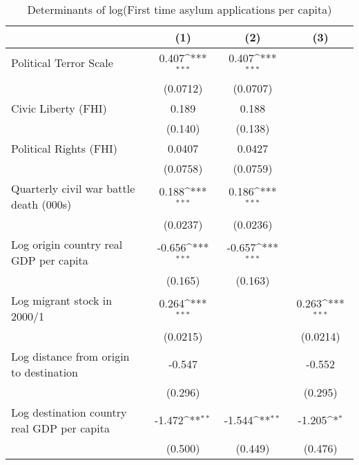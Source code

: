 \begin{table}[htbp]\centering
\def\sym#1{\ifmmode^{#1}\else\(^{#1}\)\fi}
\caption{Determinants of log(First time asylum applications per capita)}
\begin{tabular}{l*{3}{c}}
\hline\hline
                    &\multicolumn{1}{c}{(1)}         &\multicolumn{1}{c}{(2)}         &\multicolumn{1}{c}{(3)}         \\
\hline
Political Terror Scale&       0.407\sym{***}&       0.407\sym{***}&                     \\
                    &    (0.0712)         &    (0.0707)         &                     \\
[1em]
Civic Liberty (FHI) &       0.189         &       0.188         &                     \\
                    &     (0.140)         &     (0.138)         &                     \\
[1em]
Political Rights (FHI)&      0.0407         &      0.0427         &                     \\
                    &    (0.0758)         &    (0.0759)         &                     \\
[1em]
Quarterly civil war battle death (000s)&       0.188\sym{***}&       0.186\sym{***}&                     \\
                    &    (0.0237)         &    (0.0236)         &                     \\
[1em]
Log origin country real GDP per capita&      -0.656\sym{***}&      -0.657\sym{***}&                     \\
                    &     (0.165)         &     (0.163)         &                     \\
[1em]
Log migrant stock in 2000/1&       0.264\sym{***}&                     &       0.263\sym{***}\\
                    &    (0.0215)         &                     &    (0.0214)         \\
[1em]
Log distance from origin to destination&      -0.547         &                     &      -0.552         \\
                    &     (0.296)         &                     &     (0.295)         \\
[1em]
Log destination country real GDP per capita&      -1.472\sym{**} &      -1.544\sym{**} &      -1.205\sym{*}  \\
                    &     (0.500)         &     (0.449)         &     (0.476)         \\

\end{tabular}
\end{table}
